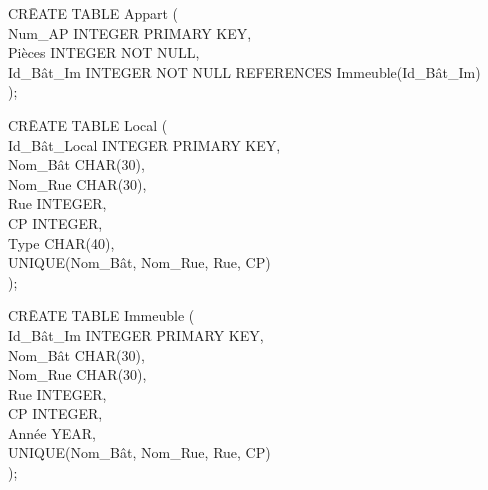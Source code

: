 \documentclass[a4paper,10.5pt]{report}
\begin{document}
		\begin{tabbing}
			CR\=EATE TABLE Appart (\\
			\> Num\_AP INTEGER PRIMARY KEY,\\
			\> Pièces INTEGER NOT NULL,\\
			\> Id\_Bât\_Im INTEGER NOT NULL REFERENCES Immeuble(Id\_Bât\_Im)\\);
		\end{tabbing}
                                                   
		\begin{tabbing}
			CR\=EATE TABLE Local (\\
			\> Id\_Bât\_Local INTEGER PRIMARY KEY,\\
			\> Nom\_Bât CHAR(30),\\
			\> Nom\_Rue CHAR(30),\\
			\> Rue INTEGER,\\
			\> CP INTEGER,\\
			\> Type CHAR(40),\\
			\> UNIQUE(Nom\_Bât, Nom\_Rue, Rue, CP)\\);
		\end{tabbing}
		\begin{tabbing}
			CR\=EATE TABLE Immeuble (\\
			\> Id\_Bât\_Im INTEGER PRIMARY KEY,\\
			\> Nom\_Bât CHAR(30),\\
			\> Nom\_Rue CHAR(30),\\
			\> Rue INTEGER,\\
			\> CP INTEGER,\\
			\> Année YEAR,\\
			\> UNIQUE(Nom\_Bât, Nom\_Rue, Rue, CP)\\);
		\end{tabbing}
\end{document}
